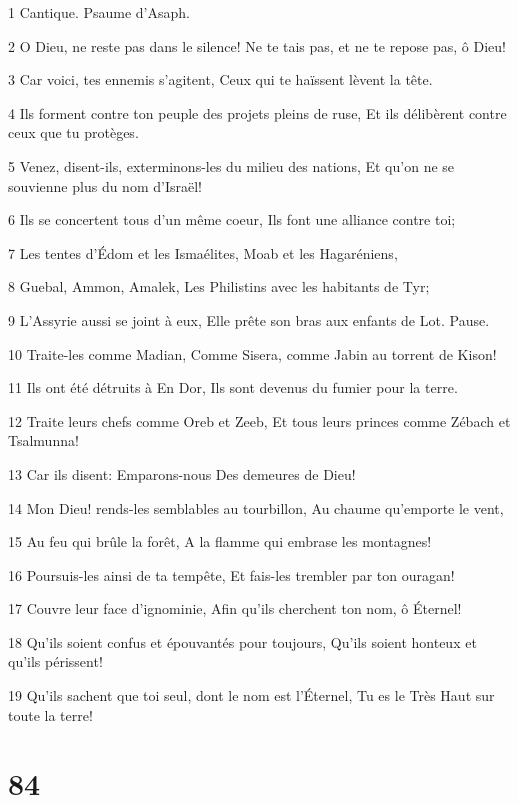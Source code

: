 \par 1 Cantique. Psaume d'Asaph.
\par 2 O Dieu, ne reste pas dans le silence! Ne te tais pas, et ne te repose pas, ô Dieu!
\par 3 Car voici, tes ennemis s'agitent, Ceux qui te haïssent lèvent la tête.
\par 4 Ils forment contre ton peuple des projets pleins de ruse, Et ils délibèrent contre ceux que tu protèges.
\par 5 Venez, disent-ils, exterminons-les du milieu des nations, Et qu'on ne se souvienne plus du nom d'Israël!
\par 6 Ils se concertent tous d'un même coeur, Ils font une alliance contre toi;
\par 7 Les tentes d'Édom et les Ismaélites, Moab et les Hagaréniens,
\par 8 Guebal, Ammon, Amalek, Les Philistins avec les habitants de Tyr;
\par 9 L'Assyrie aussi se joint à eux, Elle prête son bras aux enfants de Lot. Pause.
\par 10 Traite-les comme Madian, Comme Sisera, comme Jabin au torrent de Kison!
\par 11 Ils ont été détruits à En Dor, Ils sont devenus du fumier pour la terre.
\par 12 Traite leurs chefs comme Oreb et Zeeb, Et tous leurs princes comme Zébach et Tsalmunna!
\par 13 Car ils disent: Emparons-nous Des demeures de Dieu!
\par 14 Mon Dieu! rends-les semblables au tourbillon, Au chaume qu'emporte le vent,
\par 15 Au feu qui brûle la forêt, A la flamme qui embrase les montagnes!
\par 16 Poursuis-les ainsi de ta tempête, Et fais-les trembler par ton ouragan!
\par 17 Couvre leur face d'ignominie, Afin qu'ils cherchent ton nom, ô Éternel!
\par 18 Qu'ils soient confus et épouvantés pour toujours, Qu'ils soient honteux et qu'ils périssent!
\par 19 Qu'ils sachent que toi seul, dont le nom est l'Éternel, Tu es le Très Haut sur toute la terre!

\chapter{84}

